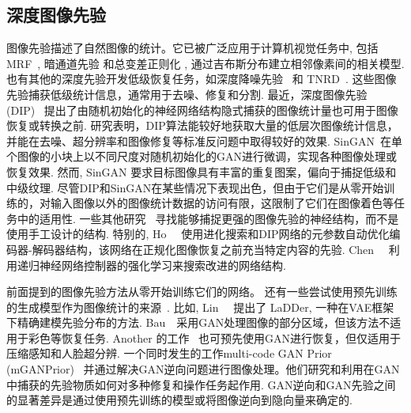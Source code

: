 \subsection{深度图像先验}
图像先验描述了自然图像的统计。它已被广泛应用于计算机视觉任务中, 包括 
MRF~\cite{roth2005fields,zhu1997prior,geman1984stochastic}, 暗通道先验 \cite{he2010single} 和总变差正则化 \cite{rudin1992nonlinear}, 通过吉布斯分布建立相邻像素间的相关模型.
也有其他的深度先验开发低级恢复任务，如深度降噪先验~\cite{zhang2017learning, bigdeli2017deep} 和 TNRD~\cite{chen2016trainable}.
这些图像先验捕获低级统计信息，通常用于去噪、修复和分割.
最近，深度图像先验 (DIP)~\cite{ulyanov2018deep} 提出了由随机初始化的神经网络结构隐式捕获的图像统计量也可用于图像恢复或转换之前.
研究表明，DIP算法能较好地获取大量的低层次图像统计信息，并能在去噪、超分辨率和图像修复等标准反问题中取得较好的效果.
SinGAN~\cite{shaham2019singan}在单个图像的小块上以不同尺度对随机初始化的GAN进行微调，实现各种图像处理或恢复效果.
然而, SinGAN 要求目标图像具有丰富的重复图案，偏向于捕捉低级和中级纹理.
尽管DIP和SinGAN在某些情况下表现出色，但由于它们是从零开始训练的，对输入图像以外的图像统计数据的访问有限，这限制了它们在图像着色等任务中的适用性.
一些其他研究~\cite{ho2020neural,chen2020dip} 寻找能够捕捉更强的图像先验的神经结构，而不是使用手工设计的结构. 特别的,
Ho~\etal~\cite{ho2020neural} 使用进化搜索和DIP网络的元参数自动优化编码器-解码器结构，该网络在正规化图像恢复之前充当特定内容的先验.
Chen~\etal~\cite{chen2020dip} 利用递归神经网络控制器的强化学习来搜索改进的网络结构.

前面提到的图像先验方法从零开始训练它们的网络。
还有一些尝试使用预先训练的生成模型作为图像统计的来源~\cite{bau2019semantic,hussein2019image}.
比如, 
Lin~\etal~\cite{Lin2020LaDDer} 提出了 LaDDer, 一种在VAE框架下精确建模先验分布的方法.
Bau~\etal~\cite{bau2019semantic}采用GAN处理图像的部分区域，但该方法不适用于彩色等恢复任务.
Another 的工作~\cite{hussein2019image} 也可预先使用GAN进行恢复，但仅适用于压缩感知和人脸超分辨.
一个同时发生的工作multi-code GAN Prior (mGANPrior)~\cite{gu2020image} 并通过解决GAN逆向问题进行图像处理。他们研究和利用在GAN中捕获的先验物质如何对多种修复和操作任务起作用. 
GAN逆向和GAN先验之间的显著差异是通过使用预先训练的模型或将图像逆向到隐向量来确定的.

